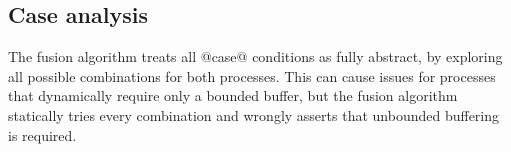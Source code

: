% 
% 
% 
% 

\subsection{Case analysis}
\label{s:FullyAbstractCase}

The fusion algorithm treats all @case@ conditions as fully abstract, by exploring all possible combinations for both processes.
This can cause issues for processes that dynamically require only a bounded buffer, but the fusion algorithm statically tries every combination and wrongly asserts that unbounded buffering is required.

